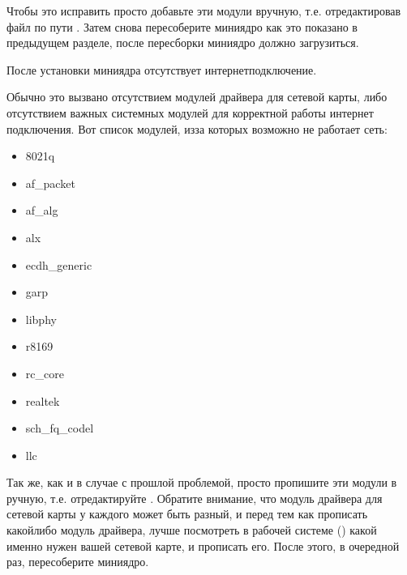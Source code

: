 \documentclass[letterpaper,10pt,russian,openany]{sphinxmanual}
\begin{document}
\sphinxAtStartPar
Чтобы это исправить просто добавьте эти модули вручную, т.е. отредактировав файл по пути .
Затем снова пересоберите мини\sphinxhyphen{}ядро как это показано в предыдущем разделе, после пересборки мини\sphinxhyphen{}ядро должно загрузиться.

\sphinxAtStartPar
{} После установки мини\sphinxhyphen{}ядра отсутствует интернет\sphinxhyphen{}подключение.

\sphinxAtStartPar
{} Обычно это вызвано отсутствием модулей драйвера для сетевой карты,
либо отсутствием важных системных модулей для корректной работы интернет подключения.
Вот список модулей, из\sphinxhyphen{}за которых возможно не работает сеть:
\begin{itemize}
\item {} 
\sphinxAtStartPar
8021q

\item {} 
\sphinxAtStartPar
af\_packet

\item {} 
\sphinxAtStartPar
af\_alg

\item {} 
\sphinxAtStartPar
alx

\item {} 
\sphinxAtStartPar
ecdh\_generic

\item {} 
\sphinxAtStartPar
garp

\item {} 
\sphinxAtStartPar
libphy

\item {} 
\sphinxAtStartPar
r8169

\item {} 
\sphinxAtStartPar
rc\_core

\item {} 
\sphinxAtStartPar
realtek

\item {} 
\sphinxAtStartPar
sch\_fq\_codel

\item {} 
\sphinxAtStartPar
llc

\end{itemize}

\sphinxAtStartPar
Так же, как и в случае с прошлой проблемой, просто пропишите эти модули в ручную, т.е. отредактируйте .
Обратите внимание, что модуль драйвера для сетевой карты у каждого может быть разный,
и перед тем как прописать какой\sphinxhyphen{}либо модуль драйвера, лучше посмотреть в рабочей системе () какой именно нужен вашей сетевой карте, и прописать его.
После этого, в очередной раз, пересоберите мини\sphinxhyphen{}ядро.
\end{document}

